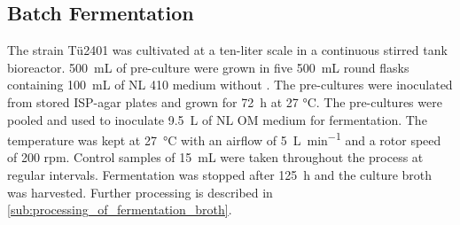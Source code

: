 	\subsection{Batch Fermentation} %
	\label{sub:fermentation}
	The strain T\"u2401 was cultivated at a ten-liter scale in a continuous stirred tank bioreactor. \SI{500}{\milli\liter} of pre-culture were grown in five \SI{500}{\milli\liter} round flasks containing \SI{100}{\milli\liter} of NL 410 medium without . The pre-cultures were inoculated from stored ISP-agar plates and grown for \SI{72}{\hour} at 27 \si{\celsius}. The pre-cultures were pooled and used to inoculate \SI{9.5}{\liter} of NL OM medium for fermentation. The temperature was kept at \SI{27}{\celsius} with an airflow of \SI{5}{\liter\per\minute} and a rotor speed of 200 rpm. Control samples of \SI{15}{\milli\liter} were taken throughout the process at regular intervals. Fermentation was stopped after \SI{125}{\hour} and the culture broth was harvested. Further processing is described in \ref{sub:processing_of_fermentation_broth}.
	

